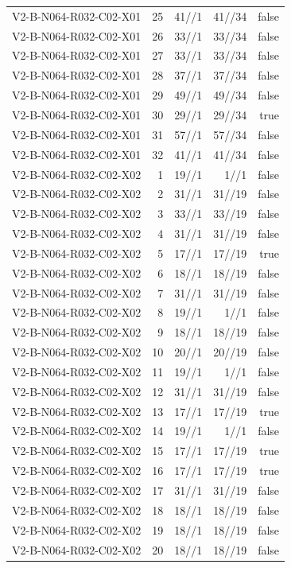 {\begin{longtable}{lrrrr}
V2-B-N064-R032-C02-X01 & 25 & 41//1 & 41//34 & false \\
V2-B-N064-R032-C02-X01 & 26 & 33//1 & 33//34 & false \\
V2-B-N064-R032-C02-X01 & 27 & 33//1 & 33//34 & false \\
V2-B-N064-R032-C02-X01 & 28 & 37//1 & 37//34 & false \\
V2-B-N064-R032-C02-X01 & 29 & 49//1 & 49//34 & false \\
V2-B-N064-R032-C02-X01 & 30 & 29//1 & 29//34 & true \\
V2-B-N064-R032-C02-X01 & 31 & 57//1 & 57//34 & false \\
V2-B-N064-R032-C02-X01 & 32 & 41//1 & 41//34 & false \\
V2-B-N064-R032-C02-X02 & 1 & 19//1 & 1//1 & false \\
V2-B-N064-R032-C02-X02 & 2 & 31//1 & 31//19 & false \\
V2-B-N064-R032-C02-X02 & 3 & 33//1 & 33//19 & false \\
V2-B-N064-R032-C02-X02 & 4 & 31//1 & 31//19 & false \\
V2-B-N064-R032-C02-X02 & 5 & 17//1 & 17//19 & true \\
V2-B-N064-R032-C02-X02 & 6 & 18//1 & 18//19 & false \\
V2-B-N064-R032-C02-X02 & 7 & 31//1 & 31//19 & false \\
V2-B-N064-R032-C02-X02 & 8 & 19//1 & 1//1 & false \\
V2-B-N064-R032-C02-X02 & 9 & 18//1 & 18//19 & false \\
V2-B-N064-R032-C02-X02 & 10 & 20//1 & 20//19 & false \\
V2-B-N064-R032-C02-X02 & 11 & 19//1 & 1//1 & false \\
V2-B-N064-R032-C02-X02 & 12 & 31//1 & 31//19 & false \\
V2-B-N064-R032-C02-X02 & 13 & 17//1 & 17//19 & true \\
V2-B-N064-R032-C02-X02 & 14 & 19//1 & 1//1 & false \\
V2-B-N064-R032-C02-X02 & 15 & 17//1 & 17//19 & true \\
V2-B-N064-R032-C02-X02 & 16 & 17//1 & 17//19 & true \\
V2-B-N064-R032-C02-X02 & 17 & 31//1 & 31//19 & false \\
V2-B-N064-R032-C02-X02 & 18 & 18//1 & 18//19 & false \\
V2-B-N064-R032-C02-X02 & 19 & 18//1 & 18//19 & false \\
V2-B-N064-R032-C02-X02 & 20 & 18//1 & 18//19 & false \\

\end{longtable}}
